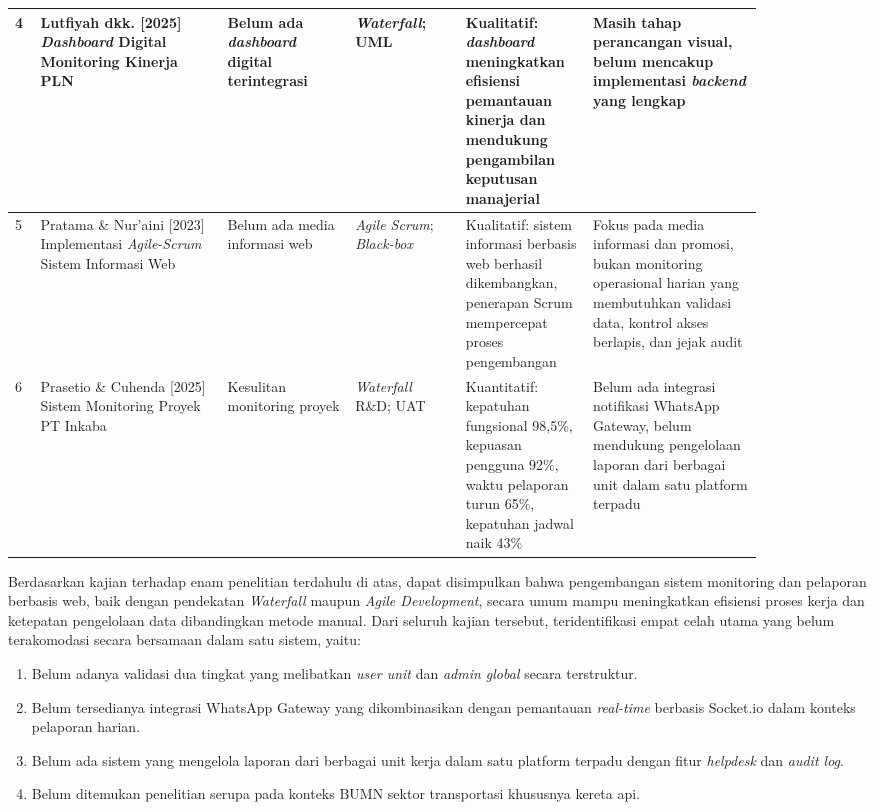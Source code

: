 \begin{landscape}
\begin{longtable}{|p{0.03\linewidth}|p{0.22\linewidth}|p{0.15\linewidth}|p{0.13\linewidth}|p{0.14\linewidth}|p{0.20\linewidth}|}
    \hline
    4 & Lutfiyah dkk. [2025] \textit{Dashboard} Digital Monitoring Kinerja PLN \cite{lutfiyah2025dashboard} & Belum ada \textit{dashboard} digital terintegrasi & \textit{Waterfall}; UML & Kualitatif: \textit{dashboard} meningkatkan efisiensi pemantauan kinerja dan mendukung pengambilan keputusan manajerial & Masih tahap perancangan visual, belum mencakup implementasi \textit{backend} yang lengkap \\
    \hline
    5 & Pratama \& Nur'aini [2023] Implementasi \textit{Agile-Scrum} Sistem Informasi Web \cite{pratama2023scrum} & Belum ada media informasi web & \textit{Agile Scrum}; \textit{Black-box} & Kualitatif: sistem informasi berbasis web berhasil dikembangkan, penerapan Scrum mempercepat proses pengembangan & Fokus pada media informasi dan promosi, bukan monitoring operasional harian yang membutuhkan validasi data, kontrol akses berlapis, dan jejak audit \\
    \hline
    6 & Prasetio \& Cuhenda [2025] Sistem Monitoring Proyek PT Inkaba \cite{nugroho2025monitoring} & Kesulitan monitoring proyek & \textit{Waterfall} R\&D; UAT & Kuantitatif: kepatuhan fungsional 98,5\%, kepuasan pengguna 92\%, waktu pelaporan turun 65\%, kepatuhan jadwal naik 43\% & Belum ada integrasi notifikasi WhatsApp Gateway, belum mendukung pengelolaan laporan dari berbagai unit dalam satu platform terpadu \\
    \hline
\end{longtable}
\end{landscape}

Berdasarkan kajian terhadap enam penelitian terdahulu di atas, dapat disimpulkan bahwa pengembangan sistem monitoring dan pelaporan berbasis web, baik dengan pendekatan \textit{Waterfall} maupun \textit{Agile Development}, secara umum mampu meningkatkan efisiensi proses kerja dan ketepatan pengelolaan data dibandingkan metode manual. Dari seluruh kajian tersebut, teridentifikasi empat celah utama yang belum terakomodasi secara bersamaan dalam satu sistem, yaitu:
\begin{enumerate}[noitemsep]
    \item Belum adanya validasi dua tingkat yang melibatkan \textit{user unit} dan \textit{admin global} secara terstruktur.
    \item Belum tersedianya integrasi WhatsApp Gateway yang dikombinasikan dengan pemantauan \textit{real-time} berbasis Socket.io dalam konteks pelaporan harian.
    \item Belum ada sistem yang mengelola laporan dari berbagai unit kerja dalam satu platform terpadu dengan fitur \textit{helpdesk} dan \textit{audit log}.
    \item Belum ditemukan penelitian serupa pada konteks BUMN sektor transportasi khususnya kereta api.
\end{enumerate}

